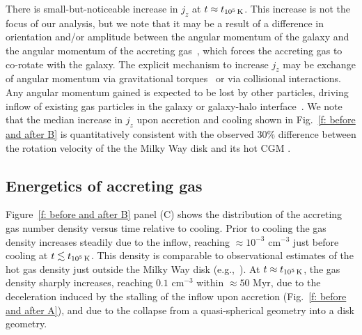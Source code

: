\documentclass[fleqn,usenatbib]{mnras}
\newcommand{\tcon}{t_{10^5\,{\rm K}}}
\begin{document}
There is small-but-noticeable increase in $j_z$ at $t \approx \tcon$.
This increase is not the focus of our analysis, but we note that it may be a result of a difference in orientation and/or amplitude between the angular momentum of the galaxy and the angular momentum of the accreting gas~\citep[e.g.][]{Danovich2012, DeFelippis2017}, which forces the accreting gas to co-rotate with the galaxy.
The explicit mechanism to increase $j_z$ may be exchange of angular momentum via gravitational torques~\citep[e.g.][]{Danovich2015} or via collisional interactions.
Any angular momentum gained is expected to be lost by other particles, driving inflow of existing gas particles in the galaxy or galaxy-halo interface~\citep[e.g.][]{Mayor1981, Pezzulli2017}.
We note that the median increase in $j_z$ upon accretion and cooling shown in Fig.~\ref{f: before and after B} is quantitatively consistent with the observed $30\%$ difference between the rotation velocity of the the Milky Way disk and its hot CGM \citep{Hodges-Kluck2016}.

\subsection{Energetics of accreting gas}
\label{s: mechanics -- energy balance}

Figure~\ref{f: before and after B} panel (C) shows the distribution of the accreting gas number density  versus time relative to cooling.
Prior to cooling the gas density increases steadily due to the inflow, reaching $\approx10^{-3}$ cm$^{-3}$ just before cooling at $t\lesssim\tcon$.
This density is comparable to observational estimates of the hot gas density just outside the Milky Way disk (e.g.,~\citealt{Li2017a}).
At $t\approx\tcon$, the gas density sharply increases, reaching $0.1$ cm$^{-3}$ within $\approx50$ Myr, due to the deceleration induced by the stalling of the inflow upon accretion (Fig.~\ref{f: before and after A}), and due to the collapse from a quasi-spherical geometry into a disk geometry. 
\end{document}
